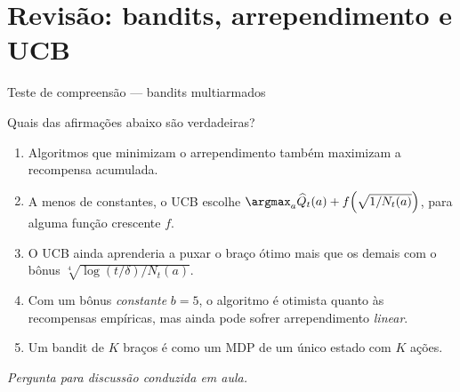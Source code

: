 \documentclass[aspectratio=169, 11pt]{beamer}
\newcommand{\paradiscussao}{\smallskip
  {\footnotesize\color{rlCinza}\itshape Pergunta para discussão conduzida em aula.}}
\newcommand{\Qh}{\widehat{Q}}
\begin{document}
\section{Revisão: bandits, arrependimento e UCB}

\begin{frame}{Teste de compreensão --- bandits multiarmados}
  \begin{quizbox}{}
    {\footnotesize Quais das afirmações abaixo são verdadeiras?
    \begin{enumerate}\setlength{\itemsep}{0.15ex}
      \item Algoritmos que minimizam o arrependimento também maximizam a
            recompensa acumulada.
      \item A menos de constantes, o UCB escolhe
            $\argmax_a \Qh_t(a) + f\!\left(\sqrt{1/N_t(a)}\right)$, para alguma
            função crescente $f$.
      \item O UCB ainda aprenderia a puxar o braço ótimo mais que os demais com
            o bônus $\sqrt[4]{\log(t/\delta)/N_t(a)}$.
      \item Com um bônus \emph{constante} $b=5$, o algoritmo é otimista quanto
            às recompensas empíricas, mas ainda pode sofrer arrependimento
            \emph{linear}.
      \item Um bandit de $K$ braços é como um MDP de um único estado com $K$
            ações.
    \end{enumerate}}
  \end{quizbox}
  \paradiscussao
\end{frame}
\end{document}
